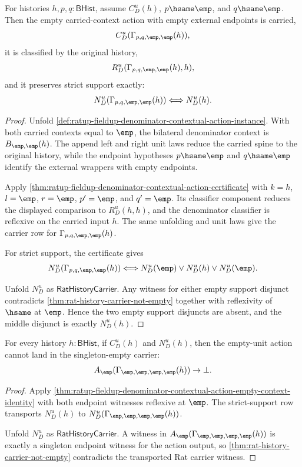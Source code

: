 \begin{theorem}
\label{thm:ratup-fieldup-denominator-contextual-action-empty-context-identity}
For histories $h,p,q:\mathsf{BHist}$, assume $C_D^u(h)$, $p\hsame\emp$, and
$q\hsame\emp$. Then the empty carried-context action with empty external
endpoints is carried,
$$
C_D^u(\Gamma_{p,q,\emp,\emp}(h)),
$$
it is classified by the original history,
$$
R_D^u(\Gamma_{p,q,\emp,\emp}(h),h),
$$
and it preserves strict support exactly:
$$
N_D^u(\Gamma_{p,q,\emp,\emp}(h))
\Longleftrightarrow
N_D^u(h).
$$
\end{theorem}
\begin{proof}
Unfold
\autoref{def:ratup-fieldup-denominator-contextual-action-instance}. With both
carried contexts equal to $\emp$, the bilateral denominator context is
$B_{\emp,\emp}(h)$. The append left and right unit laws reduce the carried
spine to the original history, while the endpoint hypotheses $p\hsame\emp$ and
$q\hsame\emp$ identify the external wrappers with empty endpoints.

Apply
\autoref{thm:ratup-fieldup-denominator-contextual-action-certificate} with
$k=h$, $l=\emp$, $r=\emp$, $p'=\emp$, and $q'=\emp$. Its classifier component
reduces the displayed comparison to $R_D^u(h,h)$, and the denominator
classifier is reflexive on the carried input $h$. The same unfolding and unit
laws give the carrier row for $\Gamma_{p,q,\emp,\emp}(h)$.

For strict support, the certificate gives
$$
N_D^u(\Gamma_{p,q,\emp,\emp}(h))
\Longleftrightarrow
N_D^u(\emp)\lor N_D^u(h)\lor N_D^u(\emp).
$$

Unfold $N_D^u$ as $\mathsf{RatHistoryCarrier}$. Any witness for either empty
support disjunct contradicts
\autoref{thm:rat-history-carrier-not-empty} together with reflexivity of
$\hsame$ at $\emp$. Hence the two empty support disjuncts are absent, and the
middle disjunct is exactly $N_D^u(h)$.
\end{proof}

\begin{theorem}
\label{thm:rat-denom-unit-contextual-action-empty-unit-singleton-absurd}
For every history $h:\mathsf{BHist}$, if $C_D^u(h)$ and $N_D^u(h)$, then
the empty-unit action cannot land in the singleton-empty carrier:
$$
A_{\emp}(\Gamma_{\emp,\emp,\emp,\emp}(h))\to\bot.
$$
\end{theorem}
\begin{proof}
Apply
\autoref{thm:ratup-fieldup-denominator-contextual-action-empty-context-identity}
with both endpoint witnesses reflexive at $\emp$. The strict-support row
transports $N_D^u(h)$ to
$N_D^u(\Gamma_{\emp,\emp,\emp,\emp}(h))$.

Unfold $N_D^u$ as $\mathsf{RatHistoryCarrier}$. A witness in
$A_{\emp}(\Gamma_{\emp,\emp,\emp,\emp}(h))$ is exactly a singleton endpoint
witness for the action output, so
\autoref{thm:rat-history-carrier-not-empty} contradicts the transported Rat
carrier witness.
\end{proof}

